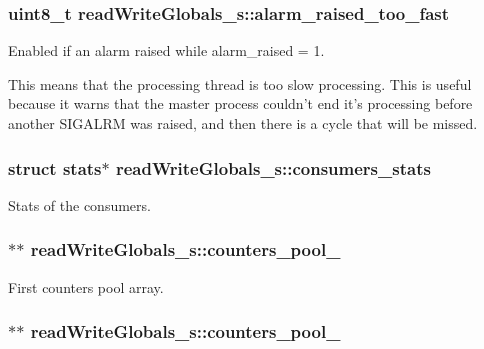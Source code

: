 \subsubsection[{alarm\+\_\+raised\+\_\+too\+\_\+fast}]{\setlength{\rightskip}{0pt plus 5cm}uint8\+\_\+t read\+Write\+Globals\+\_\+s\+::alarm\+\_\+raised\+\_\+too\+\_\+fast}\label{structread_write_globals__s_a4622b8b7990b2c656803c4dcd4e202a6}
Enabled if an alarm raised while alarm\+\_\+raised = 1.

This means that the processing thread is too slow processing. This is useful because it warns that the master process couldn't end it's processing before another S\+I\+G\+A\+L\+R\+M was raised, and then there is a cycle that will be missed. 
\subsubsection[{consumers\+\_\+stats}]{\setlength{\rightskip}{0pt plus 5cm}struct {\bf stats}$\ast$ read\+Write\+Globals\+\_\+s\+::consumers\+\_\+stats}\label{structread_write_globals__s_ae97fca857d5c9461981a6190c8c20e94}


Stats of the consumers. 

\subsubsection[{counters\+\_\+pool\+\_\+1}]{$\ast$$\ast$ read\+Write\+Globals\+\_\+s\+::counters\+\_\+pool\+\_}\label{structread_write_globals__s_a3006b2042383c65867e6d6e3c6707357}


First counters pool array. 

\subsubsection[{counters\+\_\+pool\+\_\+2}]{$\ast$$\ast$ read\+Write\+Globals\+\_\+s\+::counters\+\_\+pool\+\_}\label{structread_write_globals__s_ae3a0490966ea590d598a256378c43e36}



